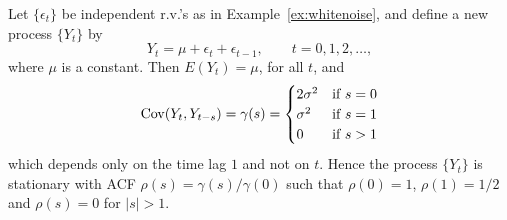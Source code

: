 \begin{ex} \label{ex:movingaverage} Let $\{ \epsilon_t \}$ be independent r.v.'s as in Example~\ref{ex:whitenoise}, and define a new process $\{ Y_t \}$ by
	\[
	Y_t = \mu + \epsilon_t + \epsilon_{t-1}, \qquad t=0, 1, 2, \ldots,
	\]
where $\mu$ is a constant.  Then $E(Y_t)= \mu$, for all $t$, and
	\[
	\operatorname{Cov}(Y_t,Y_{t-s})= \gamma(s) =
	\begin{cases}
	2 \sigma^2 & \text{if } s= 0 \\
	\sigma^2 & \text{if } s= 1 \\
	0 & \text{if } s > 1
	\end{cases}
	\]
which depends only on the time lag $1$ and not on $t$.  Hence the process $\{ Y_t \}$ is stationary with ACF $\rho(s)= \gamma(s)/\gamma(0)$ such that $\rho(0)= 1$, $\rho(1)= 1/2$ and $\rho(s)= 0$ for $\lvert s \rvert > 1$.
 
	\begin{figure}
                        \hfill
                        

\end{figure}
\end{ex}
